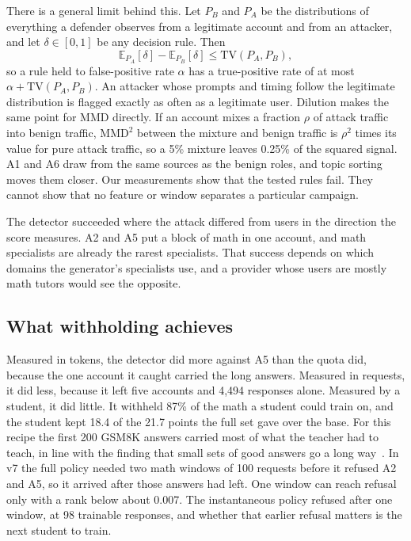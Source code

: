 \documentclass[journal]{IEEEtran}
\begin{document}
There is a general limit behind this. Let $P_B$ and $P_A$ be the distributions of everything a defender observes from a legitimate account and from an attacker, and let $\delta\in[0,1]$ be any decision rule. Then
\begin{equation}
\mathbb E_{P_A}[\delta]-\mathbb E_{P_B}[\delta]\leq\mathrm{TV}(P_A,P_B),
\end{equation}
so a rule held to false-positive rate $\alpha$ has a true-positive rate of at most $\alpha+\mathrm{TV}(P_A,P_B)$. An attacker whose prompts and timing follow the legitimate distribution is flagged exactly as often as a legitimate user. Dilution makes the same point for MMD directly. If an account mixes a fraction $\rho$ of attack traffic into benign traffic, $\mathrm{MMD}^2$ between the mixture and benign traffic is $\rho^2$ times its value for pure attack traffic, so a 5\% mixture leaves 0.25\% of the squared signal. A1 and A6 draw from the same sources as the benign roles, and topic sorting moves them closer. Our measurements show that the tested rules fail. They cannot show that no feature or window separates a particular campaign.

The detector succeeded where the attack differed from users in the direction the score measures. A2 and A5 put a block of math in one account, and math specialists are already the rarest specialists. That success depends on which domains the generator's specialists use, and a provider whose users are mostly math tutors would see the opposite.

\subsection{What withholding achieves}
Measured in tokens, the detector did more against A5 than the quota did, because the one account it caught carried the long answers. Measured in requests, it did less, because it left five accounts and 4,494 responses alone. Measured by a student, it did little. It withheld 87\% of the math a student could train on, and the student kept 18.4 of the 21.7 points the full set gave over the base. For this recipe the first 200 GSM8K answers carried most of what the teacher had to teach, in line with the finding that small sets of good answers go a long way~\cite{muennighoff2025s1}. In v7 the full policy needed two math windows of 100 requests before it refused A2 and A5, so it arrived after those answers had left. One window can reach refusal only with a rank below about 0.007. The instantaneous policy refused after one window, at 98 trainable responses, and whether that earlier refusal matters is the next student to train.
\end{document}
